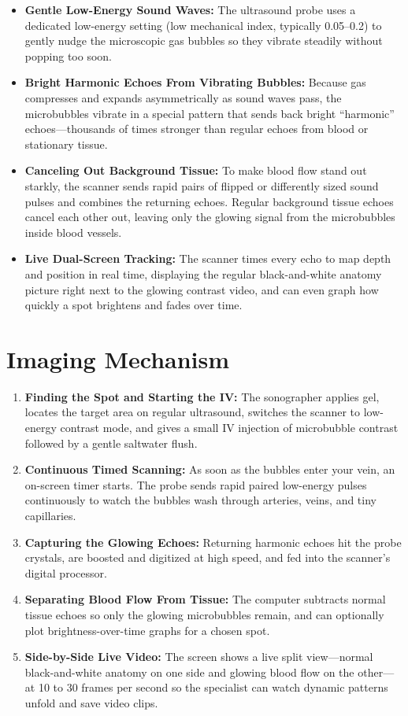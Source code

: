 \begin{itemize}
    \item \textbf{Gentle Low-Energy Sound Waves:} The ultrasound probe uses a dedicated low-energy setting (low mechanical index, typically 0.05--0.2) to gently nudge the microscopic gas bubbles so they vibrate steadily without popping too soon.
    \item \textbf{Bright Harmonic Echoes From Vibrating Bubbles:} Because gas compresses and expands asymmetrically as sound waves pass, the microbubbles vibrate in a special pattern that sends back bright ``harmonic'' echoes---thousands of times stronger than regular echoes from blood or stationary tissue.
    \item \textbf{Canceling Out Background Tissue:} To make blood flow stand out starkly, the scanner sends rapid pairs of flipped or differently sized sound pulses and combines the returning echoes. Regular background tissue echoes cancel each other out, leaving only the glowing signal from the microbubbles inside blood vessels.
    \item \textbf{Live Dual-Screen Tracking:} The scanner times every echo to map depth and position in real time, displaying the regular black-and-white anatomy picture right next to the glowing contrast video, and can even graph how quickly a spot brightens and fades over time.
\end{itemize}

\section{Imaging Mechanism}

\begin{enumerate}
    \item \textbf{Finding the Spot and Starting the IV:} The sonographer applies gel, locates the target area on regular ultrasound, switches the scanner to low-energy contrast mode, and gives a small IV injection of microbubble contrast followed by a gentle saltwater flush.
    \item \textbf{Continuous Timed Scanning:} As soon as the bubbles enter your vein, an on-screen timer starts. The probe sends rapid paired low-energy pulses continuously to watch the bubbles wash through arteries, veins, and tiny capillaries.
    \item \textbf{Capturing the Glowing Echoes:} Returning harmonic echoes hit the probe crystals, are boosted and digitized at high speed, and fed into the scanner's digital processor.
    \item \textbf{Separating Blood Flow From Tissue:} The computer subtracts normal tissue echoes so only the glowing microbubbles remain, and can optionally plot brightness-over-time graphs for a chosen spot.
    \item \textbf{Side-by-Side Live Video:} The screen shows a live split view---normal black-and-white anatomy on one side and glowing blood flow on the other---at 10 to 30 frames per second so the specialist can watch dynamic patterns unfold and save video clips.
\end{enumerate}

